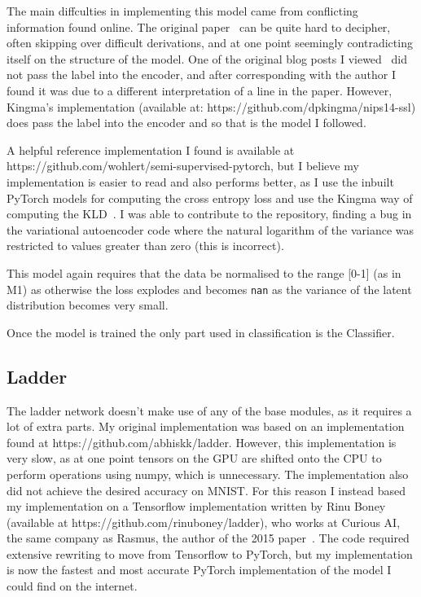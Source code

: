 The main diffculties in implementing this model came from conflicting information found online. 
The original paper~\cite{DBLP:journals/corr/KingmaRMW14} can be quite hard to decipher, often skipping over difficult derivations, and 
at one point seemingly contradicting itself on the structure of the model.
One of the original blog posts I viewed~\cite{Semisupe95:online} did not pass the label into the 
encoder, and after corresponding with the author I found it was due to a different interpretation of a line in the paper. However,
Kingma's implementation (available at: https://github.com/dpkingma/nips14-ssl) does pass the label into the encoder and so that is the 
model I followed. 

A helpful reference implementation I found is available at https://github.com/wohlert/semi-supervised-pytorch, but I believe my implementation is 
easier to read and also performs better, as I use the inbuilt PyTorch models for computing the cross entropy loss and use the Kingma way 
of computing the KLD~\cite{DBLP:journals/corr/KingmaW13}. I was able to contribute to the repository, finding a bug in the 
variational autoencoder code where the natural logarithm of the variance was restricted to values greater than zero (this is incorrect).

This model again requires that the data be normalised to the range [0-1] (as in M1) as otherwise the loss explodes and becomes 
\texttt{nan} as the variance of the latent distribution becomes very small.

Once the model is trained the only part used in classification is the Classifier.

\subsection{Ladder} \label{ladder_imp}

The ladder network doesn't make use of any of the base modules, as it requires a lot of extra parts. My original implementation 
was based on an implementation found at https://github.com/abhiskk/ladder. However, this implementation is very slow, as at one point 
tensors on the GPU are shifted onto the CPU to perform operations using numpy, which is unnecessary. The implementation also did 
not achieve the desired accuracy on MNIST. For this reason I instead based my implementation on a Tensorflow implementation written by 
Rinu Boney
(available at https://github.com/rinuboney/ladder), who works at Curious AI, the same company as Rasmus, the author of
the 2015 paper~\cite{DBLP:journals/corr/RasmusVHBR15}. The code required extensive rewriting to move from Tensorflow to PyTorch,
but my implementation is now the fastest and most accurate PyTorch implementation of the model I could find on the internet.

